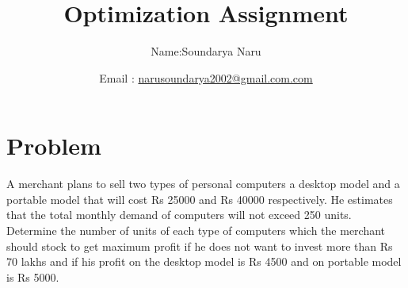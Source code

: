 \documentclass[10pt, a4paper]{article}
\begin{document}
\title{Optimization Assignment}
\author{Name:Soundarya Naru\and Email :  \url{narusoundarya2002@gmail.com.com}}
\date{}
\maketitle
  \section{Problem}
A merchant plans to sell two types
of personal computers a desktop model and a portable
model that will cost Rs 25000 and Rs 40000 respectively. He
estimates that the total monthly demand of computers will
not exceed 250 units. Determine the number of units of each
type of computers which the merchant should stock to get
maximum profit if he does not want to invest more than Rs
70 lakhs and if his profit on the desktop model is Rs 4500
and on portable model is Rs 5000.
\end{document}
